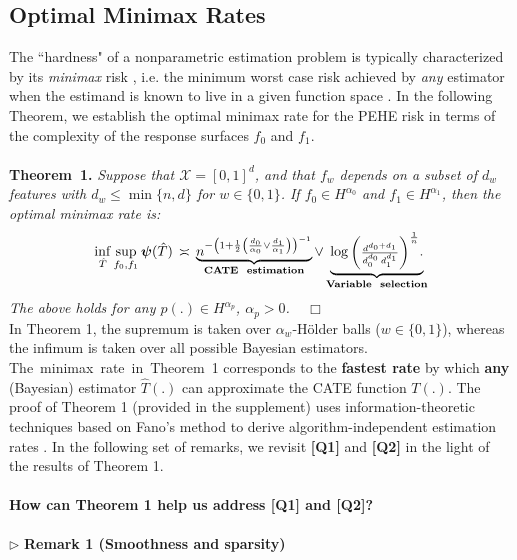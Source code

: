 \documentclass [PhD] {uclathes}
\begin{document}
\subsection{Optimal Minimax Rates}
\label{BMS2}
The ``hardness" of a nonparametric estimation problem is typically characterized by its \textit{minimax} risk \cite{stone1982optimal}, i.e. the minimum worst case risk achieved by \textit{any} estimator when the estimand is known to live in a given function space \cite{yang2015minimax}. In the following Theorem, we establish the optimal minimax rate for the PEHE risk in terms of the complexity of the response surfaces $f_0$ and $f_1$.\\ 
\\
\textbf{Theorem~1.} \textit{Suppose that $\mathcal{X} = [0,1]^d$, and that $f_w$ depends on a subset of $d_w$ features with $d_w \leq \min\{n,d\}$ for $w \in \{0,1\}$. If $f_0 \in H^{\alpha_0}$ and $f_1 \in H^{\alpha_1}$, then the optimal minimax rate is:} 
\begin{align}
\inf_{\hat{T}} \sup_{f_0,f_1} \mathbold{\psi}(\hat{T}) \,\asymp\, \underbrace{n^{-\left(1+\frac{1}{2}\left(\frac{d_0}{\alpha_0}\vee \frac{d_1}{\alpha_1}\right)\right)^{-1}}}_{\textbf{CATE\,\, estimation}} \vee \underbrace{\log \mbox{\footnotesize$\left(\frac{d^{d_0+d_1}}{d_0^{d_0}\, d_1^{d_1}}\right)^{\frac{1}{n}}$}.}_{\textbf{Variable\,\, selection}}\nonumber
\end{align} 
\textit{The above holds for any $p(.) \in H^{\alpha_p}$, $\alpha_p > 0$.} \,\,\, $\mathbf{\Box}$ \\

In Theorem 1, the supremum is taken over $\alpha_w$-H\"older balls ($w \in \{0,1\}$), whereas the infimum is taken over all possible Bayesian estimators. The~minimax~rate~in~Theorem~1 corresponds to the \textbf{fastest rate} by which \textbf{any} (Bayesian) estimator $\hat{T}(.)$ can approximate the CATE function $T(.)$. The proof of Theorem 1 (provided in the supplement) uses information-theoretic techniques based on Fano's method to derive algorithm-independent estimation rates \cite{yang1999information}. In the following set of remarks, we revisit \textbf{[Q1]} and \textbf{[Q2]} in the light of the results of Theorem 1.\\ 
\\ 
\textbf{How can Theorem 1 help us address \mbox{\footnotesize \textbf{[Q1]}} and \mbox{\footnotesize \textbf{[Q2]}}?}\\
\\
$\triangleright$ \textbf{Remark 1 (Smoothness and sparsity)}
\end{document}
